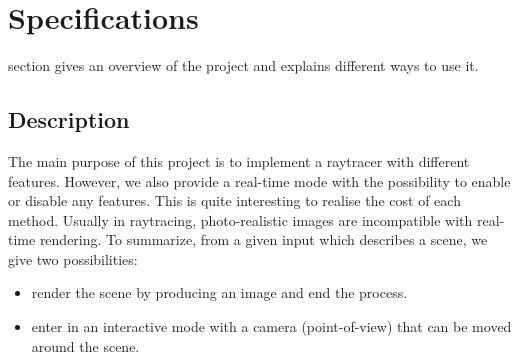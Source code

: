 \documentclass[a4paper,12pt,journal,twoside,compsoc]{PPIEEEtran}
\begin{document}
\section{Specifications}
\label{spec}
 section gives an overview of the project and explains different ways to use it.
\subsection{Description}
The main purpose of this project is to implement a raytracer with different
features. However, we also provide a real-time mode with the possibility to
enable or disable any features. This is quite interesting to realise the cost
of each method. Usually in raytracing, photo-realistic images are incompatible
with real-time rendering.
To summarize, from a given input which describes a scene, we give two possibilities:
\begin{itemize}
\item render the scene by producing an image and end the process.
\item enter in an interactive mode with a camera (point-of-view) that can be moved around the scene.
\end{itemize}
\end{document}
